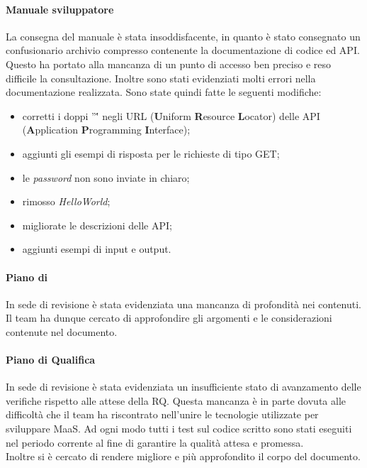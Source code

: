 \paragraph*{Manuale sviluppatore}
La consegna del manuale è stata insoddisfacente, in quanto è stato consegnato un confusionario archivio compresso contenente la documentazione di codice ed API. Questo ha portato alla mancanza di un punto di accesso ben preciso e reso difficile la consultazione. Inoltre sono stati evidenziati molti errori nella documentazione realizzata. Sono state quindi fatte le seguenti modifiche:
\begin{itemize}
\item corretti i doppi ''\'' negli URL (\textbf{U}niform \textbf{R}esource \textbf{L}ocator) delle API (\textbf{A}pplication \textbf{P}rogramming \textbf{I}nterface);
\item aggiunti gli esempi di risposta per le richieste di tipo GET;
\item le \textit{password} non sono inviate in chiaro;
\item rimosso \textit{HelloWorld};
\item migliorate le descrizioni delle API;
\item aggiunti esempi di input e output.
\end{itemize}

\paragraph*{Piano di }
In sede di revisione è stata evidenziata una mancanza di profondità nei contenuti. Il team ha dunque cercato di approfondire gli argomenti e le considerazioni contenute nel documento.

\paragraph*{Piano di Qualifica}
In sede di revisione è stata evidenziata un insufficiente stato di avanzamento delle verifiche rispetto alle attese della RQ. Questa mancanza è in parte dovuta alle difficoltà che il team ha riscontrato nell'unire le tecnologie utilizzate per sviluppare MaaS. Ad ogni modo tutti i test sul codice scritto sono stati eseguiti nel periodo corrente al fine di garantire la qualità attesa e promessa. \\
Inoltre si è cercato di rendere migliore e più approfondito il corpo del documento.